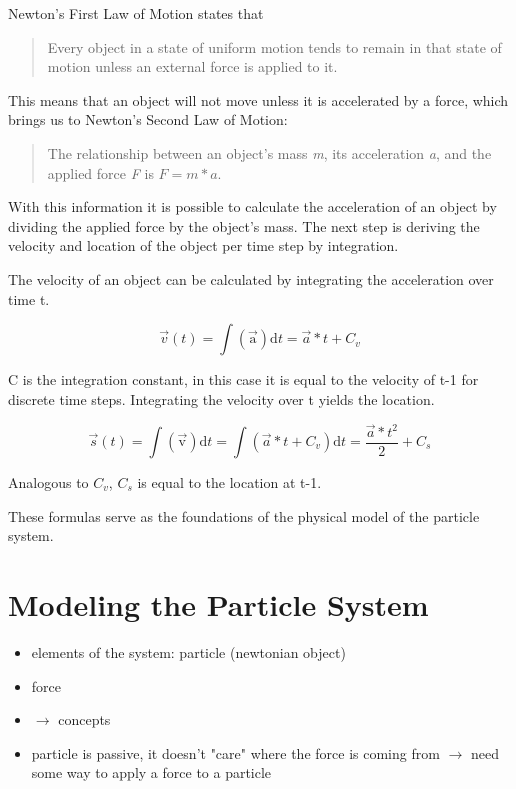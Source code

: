 \documentclass[runningheads,a4paper]{llncs}
\begin{document}
Newton's First Law of Motion states that \begin{quotation}
Every object in a state of uniform motion tends to remain in that state of motion unless an external force is applied to it. \end{quotation}

This means that an object will not move unless it is accelerated by a force, which brings us to Newton's Second Law of Motion: \begin{quotation}
The relationship between an object's mass \emph{m}, its acceleration \emph{a}, and the applied force \emph{F} is $ F = m*a $.
\end{quotation}

With this information it is possible to calculate the acceleration of an object by dividing the applied force by the object's mass. The next step is deriving the velocity and location of the object per time step by integration.

The velocity of an object can be calculated by integrating the acceleration over time t. 

\[\overrightarrow{v}(t) = \int \mathrm{(\overrightarrow{a})} \mathrm{d}t = \overrightarrow{a}*t + C_v\]

C is the integration constant, in this case it is equal to the velocity of t-1 for discrete time steps. Integrating the velocity over t yields the location.

\[\overrightarrow{s}(t) = \int \mathrm{(\overrightarrow{v})} \mathrm{d}t = \int (\overrightarrow{a}*t + C_v) \mathrm{d}t = \frac{\overrightarrow{a}*t^2}{2} + C_s\]

Analogous to $C_v$, $C_s$ is equal to the location at t-1.

These formulas serve as the foundations of the physical model of the particle system. 

\section{Modeling the Particle System}
\begin{itemize}
\item elements of the system: particle (newtonian object)
\item force

\item $\rightarrow$ concepts

\item particle is passive, it doesn't "care" where the force is coming from $\rightarrow$ need some way to apply a force to a particle
\end{itemize}
\end{document}
